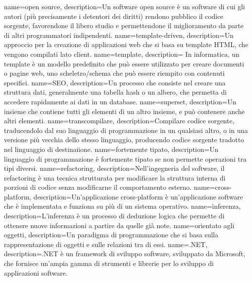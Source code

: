 {
    name=open source,
    description={Un software open source è un software di cui gli autori (più precisamente i detentori dei diritti) rendono pubblico il codice sorgente, favorendone il libero studio e permettendone il miglioramento da parte di altri programmatori indipendenti.}
}
{
    name=template-driven,
    description={Un approccio per la creazione di applicazioni web che si basa su template HTML, che vengono compilati lato client.}
}
{
    name=template,
    description={
        In informatica, un template è un modello predefinito che può essere utilizzato per creare documenti o pagine web, uno scheletro/schema che può essere riempito con contenuti specifici.
        }
}
{
    name=SEO,
    description={Un processo che consiste nel creare una struttura dati, generalmente una tabella hash o un albero, che permetta di accedere rapidamente ai dati in un database.}
}
{
    name=superset,
    description={Un insieme che contiene tutti gli elementi di un altro insieme, e può contenere anche altri elementi.}
}
{
    name=transcompilare,
    description={Compilare codice sorgente, traducendolo dal suo linguaggio di programmazione in un qualsiasi altro, o in una versione più vecchia dello stesso linguaggio, producendo codice sorgente tradotto nel linguaggio di destinaiione.}
}
{
    name=fortemente tipato,
    description={Un linguaggio di programmazione è fortemente tipato se non permette operazioni tra tipi diversi.}
}
{
    name=refactoring,
    description={Nell'ingegneria del software, il refactoring è una tecnica strutturata per modificare la struttura interna di porzioni di codice senza modificarne il comportamento esterno.}
}
{
    name=cross-platform,
    description={Un'applicazione cross-platform è un'applicazione software che è implementata e funziona su più di un sistema operativo.}
}
{
    name=inferenza,
    description={L'inferenza è un processo di deduzione logica che permette di ottenere nuove informazioni a partire da quelle già note.}
}
{
    name=orientato agli oggetti,
    description={Un paradigma di programmazione che si basa sulla rappresentazione di oggetti e sulle relazioni tra di essi.}
}
{
    name=.NET,
    description={.NET è un framework di sviluppo software, sviluppato da Microsoft, che fornisce un'ampia gamma di strumenti e librerie per lo sviluppo di applicazioni software.}
}
